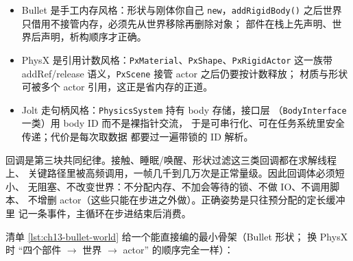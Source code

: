 \documentclass[12pt,a4paper,fontset=fandol]{ctexbook}
\newcommand{\Fn}[1]{\texttt{#1()}}
\newcommand{\Tp}[1]{\texttt{#1}}
\newcommand{\Bk}{\discretionary{}{}{}}
\begin{document}
\begin{itemize}
  \item Bullet 是手工内存风格：形状与刚体你自己 \Tp{new}，\Fn{addRigidBody}
        之后世界只借用不接管内存，必须先从世界移除再删除对象；
        部件在栈上先声明、世界后声明，析构顺序才正确。
  \item PhysX 是引用计数风格：\Tp{PxMaterial}、\Tp{PxShape}、\Tp{Px{\Bk}Rigid{\Bk}Actor}
        这一族带 add{\Bk}Ref/{\Bk}release 语义，\Tp{PxScene} 接管 actor 之后仍要按计数释放；
        材质与形状可被多个 actor 引用，这正是省内存的正道。
  \item Jolt 走句柄风格：\Tp{Physics{\Bk}System} 持有 body 存储，接口层
        （\Tp{BodyInterface} 一类）用 body ID 而不是裸指针交流，
        于是可串行化、可在任务系统里安全传递；代价是每次取数据
        都要过一遍带锁的 ID 解析。
\end{itemize}

回调是第三块共同纪律。接触、睡眠/唤醒、形状过滤这三类回调都在求解线程上、
关键路径里被高频调用，一帧几千到几万次是正常量级。因此回调体必须短小、
无阻塞、不改变世界：不分配内存、不加会等待的锁、不做 IO、不调用脚本、
不增删 actor（这些只能在步进之外做）。正确姿势是只往预分配的定长缓冲里
记一条事件，主循环在步进结束后消费。

清单 \ref{lst:ch13-bullet-world} 给一个能直接编的最小骨架（Bullet 形状；
换 PhysX 时 ``四个部件 $\rightarrow$ 世界 $\rightarrow$ actor'' 的顺序完全一样）：
\end{document}
